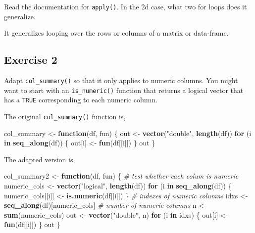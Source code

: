 \documentclass[]{book}
\newenvironment{Shaded}{\begin{snugshade}}{\end{snugshade}}
\newcommand{\CommentTok}[1]{\textcolor[rgb]{0.56,0.35,0.01}{\textit{#1}}}
\newcommand{\ControlFlowTok}[1]{\textcolor[rgb]{0.13,0.29,0.53}{\textbf{#1}}}
\newcommand{\KeywordTok}[1]{\textcolor[rgb]{0.13,0.29,0.53}{\textbf{#1}}}
\newcommand{\NormalTok}[1]{#1}
\newcommand{\StringTok}[1]{\textcolor[rgb]{0.31,0.60,0.02}{#1}}
\theoremstyle{plain}
\theoremstyle{remark}
\theoremstyle{definition}
\theoremstyle{definition}
\theoremstyle{definition}
\theoremstyle{remark}
\begin{document}
Read the documentation for \texttt{apply()}. In the 2d case, what two
for loops does it generalize.

It generalizes looping over the rows or columns of a matrix or
data-frame.

\hypertarget{exercise-2-57}{%
\subsection{Exercise 2}\label{exercise-2-57}}

Adapt \texttt{col\_summary()} so that it only applies to numeric
columns. You might want to start with an \texttt{is\_numeric()} function
that returns a logical vector that has a \texttt{TRUE} corresponding to
each numeric column.

The original \texttt{col\_summary()} function is,

\begin{Shaded}
\begin{Highlighting}[]
\NormalTok{col_summary <-}\StringTok{ }\ControlFlowTok{function}\NormalTok{(df, fun) \{}
\NormalTok{  out <-}\StringTok{ }\KeywordTok{vector}\NormalTok{(}\StringTok{"double"}\NormalTok{, }\KeywordTok{length}\NormalTok{(df))}
  \ControlFlowTok{for}\NormalTok{ (i }\ControlFlowTok{in} \KeywordTok{seq_along}\NormalTok{(df)) \{}
\NormalTok{    out[i] <-}\StringTok{ }\KeywordTok{fun}\NormalTok{(df[[i]])}
\NormalTok{  \}}
\NormalTok{  out}
\NormalTok{\}}
\end{Highlighting}
\end{Shaded}

The adapted version is,

\begin{Shaded}
\begin{Highlighting}[]
\NormalTok{col_summary2 <-}\StringTok{ }\ControlFlowTok{function}\NormalTok{(df, fun) \{}
  \CommentTok{# test whether each colum is numeric}
\NormalTok{  numeric_cols <-}\StringTok{ }\KeywordTok{vector}\NormalTok{(}\StringTok{"logical"}\NormalTok{, }\KeywordTok{length}\NormalTok{(df))}
  \ControlFlowTok{for}\NormalTok{ (i }\ControlFlowTok{in} \KeywordTok{seq_along}\NormalTok{(df)) \{}
\NormalTok{    numeric_cols[[i]] <-}\StringTok{ }\KeywordTok{is.numeric}\NormalTok{(df[[i]])}
\NormalTok{  \}}
  \CommentTok{# indexes of numeric columns}
\NormalTok{  idxs <-}\StringTok{ }\KeywordTok{seq_along}\NormalTok{(df)[numeric_cols]}
  \CommentTok{# number of numeric columns}
\NormalTok{  n <-}\StringTok{ }\KeywordTok{sum}\NormalTok{(numeric_cols)}
\NormalTok{  out <-}\StringTok{ }\KeywordTok{vector}\NormalTok{(}\StringTok{"double"}\NormalTok{, n)}
  \ControlFlowTok{for}\NormalTok{ (i }\ControlFlowTok{in}\NormalTok{ idxs) \{}
\NormalTok{    out[i] <-}\StringTok{ }\KeywordTok{fun}\NormalTok{(df[[i]])}
\NormalTok{  \}}
\NormalTok{  out}
\NormalTok{\}}
\end{Highlighting}
\end{Shaded}
\end{document}

